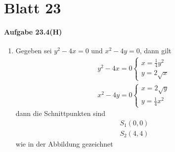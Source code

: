 \section*{Blatt 23}

\newpage

\paragraph{Aufgabe 23.4(H)}

\begin{enumerate}

\item[]

Gegeben sei $y^2-4x=0$ und $x^2-4y=0$, dann gilt
\begin{align}
y^2-4x=0
\left\{
\begin{array}{lcl}
x=\frac{1}{4}y^2 \\
y=2\sqrt{x}
\end{array}
\right. \\
x^2-4y=0
\left\{
\begin{array}{lcl}
x=2\sqrt{y} \\
y=\frac{1}{4}x^2
\end{array}
\right.
\end{align}
dann die Schnittpunkten sind
\begin{align}
S_1(0,0) \\
S_2(4,4)
\end{align}
wie in der Abbildung gezeichnet
\begin{center}


\begin{tikzpicture}[x=0.75pt,y=0.75pt,yscale=-1,xscale=1]


\end{tikzpicture}
\end{center}
\end{enumerate}
